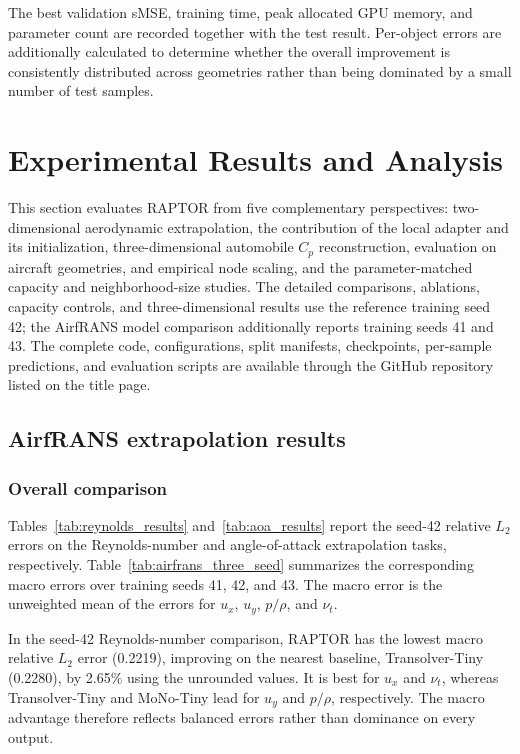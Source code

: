 \documentclass[a4paper,fleqn]{cas-sc}
\begin{document}
The best validation sMSE, training time, peak allocated GPU memory, and
parameter count are recorded together with the test result. Per-object
errors are additionally calculated to determine whether the overall
improvement is consistently distributed across geometries rather than being
dominated by a small number of test samples.

\section{Experimental Results and Analysis}
\label{sec:results}

This section evaluates RAPTOR from five complementary perspectives:
two-dimensional aerodynamic extrapolation, the contribution of the local
adapter and its initialization, three-dimensional automobile \(C_p\)
reconstruction, evaluation on aircraft geometries, and empirical node
scaling, and the parameter-matched capacity and neighborhood-size studies.
The detailed comparisons, ablations, capacity controls, and three-dimensional
results use the reference training seed 42; the AirfRANS model comparison
additionally reports training seeds 41 and 43. The complete code,
configurations, split manifests, checkpoints, per-sample predictions, and
evaluation scripts are available through the GitHub repository listed on
the title page.

\subsection{AirfRANS extrapolation results}
\label{subsec:airfrans_results}

\subsubsection{Overall comparison}

Tables~\ref{tab:reynolds_results} and~\ref{tab:aoa_results} report the
seed-42 relative \(L_2\) errors on the Reynolds-number and angle-of-attack
extrapolation tasks, respectively. Table~\ref{tab:airfrans_three_seed}
summarizes the corresponding macro errors over training seeds 41, 42,
and 43. The macro error is the unweighted mean of the errors for
\(u_x\), \(u_y\), \(p/\rho\), and \(\nu_t\).



In the seed-42 Reynolds-number comparison, RAPTOR has the lowest macro
relative \(L_2\) error (0.2219), improving on the nearest baseline,
Transolver-Tiny (0.2280), by 2.65\% using the unrounded values. It is
best for \(u_x\) and \(\nu_t\), whereas
Transolver-Tiny and MoNo-Tiny lead for \(u_y\) and \(p/\rho\), respectively.
The macro advantage therefore reflects balanced errors rather than dominance
on every output.
\end{document}
